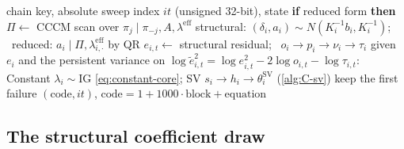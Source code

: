 \begin{algorithm}[hbp]%
  \caption{One Gibbs sweep of one chain (compact form).}
  \label{alg:sweep}
  \small
  \begin{algorithmic}[1]
    \Require chain key, absolute sweep index $it$ (unsigned 32-bit), state
    \State \textbf{if} reduced form \textbf{then} $\Pi \gets$ CCCM scan over $\pi_j \mid \pi_{-j}, A, \lambda^{\mathrm{eff}}$
      \State structural: $(\delta_i, a_i) \sim N(K_i^{-1}b_i, K_i^{-1})$; \ reduced: $a_i \mid \Pi, \lambda^{\mathrm{eff}}_{i,\cdot}$ by QR
      \State $e_{i,t} \gets$ structural residual; \ $o_i \to p_i \to \nu_i \to \tau_i$ given $e_i$ and the persistent variance
      \State on $\log\tilde e_{i,t}^2 = \log e_{i,t}^2 - 2\log o_{i,t} - \log\tau_{i,t}$: Constant $\lambda_i \sim \mathrm{IG}$
        \eqref{eq:constant-core}; SV $s_i \to h_i \to \theta^{\mathrm{SV}}_i$ (\cref{alg:C-sv})
    \EndFor
    \State keep the first failure $(\text{code}, it)$, $\text{code} = 1 + 1000\cdot\text{block} + \text{equation}$
  \end{algorithmic}
\end{algorithm}

\subsection{The structural coefficient draw}\label{sec:samp-coef}

